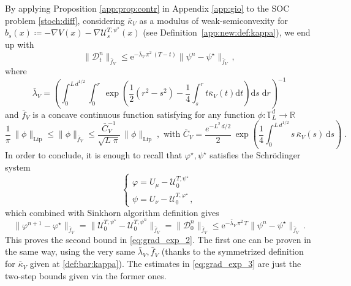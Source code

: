 \documentclass[final,12pt]{colt2023} %
\def\rset{\mathbb{R}}
\newcommand{\bes}{\begin{equation}}
\newcommand{\ees}{\end{equation}}
\newcommand{\De}{\mathrm{d}}
\newcommand{\rme}{\mathrm{e}}
\def\torus{\tset}
\def\torusL{\torus_L}
\def\rset{\mathbb{R}}
\def\tset{\mathbb{T}}
\def\eqsp{\;}
\def\varphistar{\varphi^\star}
\def\psistar{\psi^{\star}}
\def\blambda{\bar{\lambda}}
\def\blambdaV{\blambda_V}
\begin{document}
By applying Proposition \ref{app:prop:contr} in Appendix \ref{app:gio} to the SOC problem \eqref{stoch:diff}, considering $\bar{\kappa}_V$ as a modulus of weak-semiconvexity for $b_s(x)\coloneqq -\nabla V(x)-\nabla \mathcal{U}^{T,\psistar}_s(x)$ (see Definition~\ref{app:new:def:kappa}), we end up with
\bes
\|\mathcal{D}_t^n\|_{\bar f_V}\leq \rme^{-\blambdaV\,\pi^2\,(T-t)}\|\psi^n-\psistar\|_{\bar f_V}\, ,
\ees
where 
\begin{equation}\label{eq:lambda_bar}
    \blambdaV  = \left(\int_0^{L \, d^{1/2}} \int_0^r  \, \exp\left(\frac{1}{2}(r^2-s^2)-\frac{1}{4}\int_s^r t\bar{\kappa}_V(t)\De t \right)\De s\eqsp\De r\right)^{-1}
\end{equation}
and $\bar{f}_V$ is a concave continuous function satisfying for any function $\phi : \torusL^d \to \rset$
\begin{equation}
\frac{1}{\pi}\,\|\phi\|_{\mathrm{Lip}}\leq \|\phi\|_{\bar{f}_V}\leq \frac{\bar{C}_V^{-1}}{\sqrt{L\eqsp \pi}}\,\|\phi\|_{\mathrm{Lip}}\eqsp, \text{ with } \bar{C}_V=\frac{e^{-L^2\,d/2}}{2}\,\exp\left(\frac14\int_0^{L\,d^{1/2}} s\,\bar{\kappa}_V(s)\,\De s\right) \eqsp .
\label{eq:equiv_lip_norm_f_bar}
\end{equation}
In order to conclude, it is enough to recall that $\varphistar,\psistar$ satisfies the Schr\"odinger system
\[\begin{cases}
\varphi=U_\mu-\mathcal{U}^{T,\psistar}_0\\
\psi=U_\nu-\mathcal{U}^{T,\varphistar}_0\,,
\end{cases}\]
which combined with Sinkhorn algorithm definition gives
\bes
\|\varphi^{n+1}-\varphistar\|_{\bar f_V}=\|\mathcal{U}^{T,\psistar}_0-\mathcal{U}^{T,\psi^n}_0\|_{\bar f_V}=\|\mathcal{D}_0^n\|_{\bar f_V}\leq \rme^{-\blambdaV\,\pi^2\,T}\|\psi^n-\psistar\|_{\bar f_V}\,.
\ees
This proves the second bound in \eqref{eq:grad_exp_2}. The first one can be proven in the same way, using the very same $\blambdaV,\bar f_V$ (thanks to the symmetrized definition for $\bar{\kappa}_V$ given at \eqref{def:bar:kappa}). The estimates in \eqref{eq:grad_exp_3} are just the two-step bounds given via the former ones.











    
\end{document}
